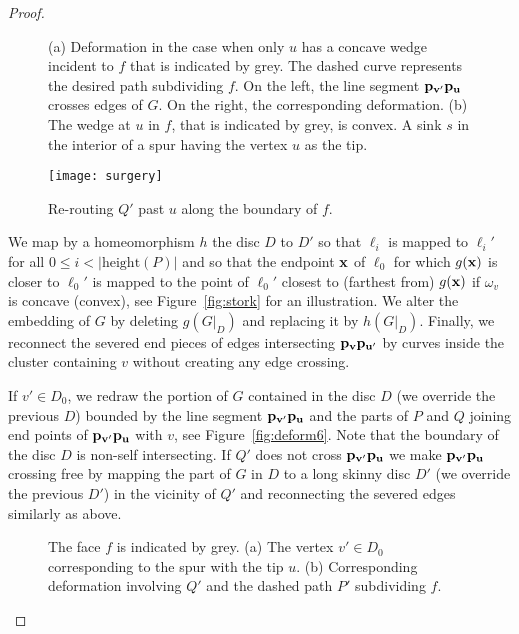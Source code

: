 \documentclass{llncs}
\def\length{\mathrm{height}}
\begin{document}
\begin{proof}
 
 

 \begin{figure}[h]
  \centering
\centering
{}
    	\hspace{3px}

\caption{(a) Deformation in the case when only $u$ has a concave wedge incident to $f$ that is indicated by grey.
The dashed curve represents the desired path subdividing $f$.
On the left, the line segment ${\bf p_{v'}p_{u}}$ crosses  edges of $G$. 
On the right, the corresponding deformation. (b) The wedge at $u$
in $f$, that is indicated by grey, is convex.  A sink $s$  in the interior of a spur having the vertex $u$
as the tip.}
\end{figure}




\begin{figure}
 \centering
\texttt{[image: surgery]}
\caption{Re-routing $Q'$ past $u$ along the boundary of $f$.}
\label{fig:deform8} 
\end{figure}

We map by a homeomorphism $h$ the disc $D$ to $D'$ so that $\ell_i$
is mapped to $\ell_i'$ for all $0\leq i<|\length(P)|$
and so that the endpoint ${\bf x}$ of $\ell_0$ for which $g({\bf x})$ is closer to $\ell_0'$ is mapped to the point of $\ell_0'$ closest to (farthest from) 
$g({\bf x})$ if $\omega_v$ is concave (convex), see Figure~\ref{fig:stork} for an illustration.
We alter the embedding of $G$ by deleting $g(G|_D)$ and replacing it
by $h(G|_D)$.
Finally, we  reconnect the severed end pieces of edges intersecting ${\bf p_vp_{u'}}$ by curves inside the cluster containing $v$ without
creating any edge crossing. 



If $v'\in D_0$, we redraw the portion of $G$ contained in the disc $D$ (we override the previous $D$) bounded by the line segment ${\bf p_{v'}p_u}$
and the parts of $P$ and $Q$ joining end points of ${\bf p_{v'}p_u}$  with $v$, see Figure~\ref{fig:deform6}.
Note that the boundary of the disc $D$ is non-self intersecting.
If $Q'$ does not cross ${\bf p_{v'}p_u}$ we make ${\bf p_{v'}p_u}$ crossing free by mapping
the part of $G$ in $D$ to a long skinny disc $D'$  (we override the previous $D'$) in the vicinity of $Q'$ and reconnecting the severed edges similarly 
as above.

 \begin{figure}
  \centering
\centering
{}
    	\hspace{1px}
\caption{The face $f$ is indicated by grey. (a) The vertex  $v'\in D_0$ corresponding to the spur with the tip $u$. (b) Corresponding  deformation involving $Q'$ and the dashed path $P'$ subdividing $f$.}
\end{figure}




\end{proof}
\end{document}
